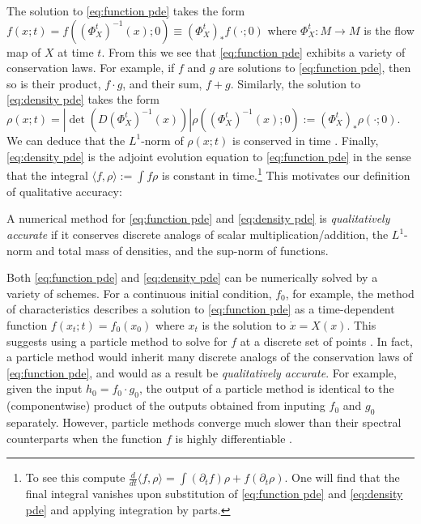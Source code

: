 \documentclass[final,leqno]{siamltex1213}
\begin{document}
The solution to \eqref{eq:function pde} takes the form $f(x;t) = f( (\Phi_{X}^{t})^{-1}(x) ; 0) \equiv (\Phi_{X}^{t})_{*} f(\cdot;0)$
where $\Phi_{X}^{t}:M \to M$ is the flow map of $X$ at time $t$.
From this we see that \eqref{eq:function pde} exhibits a variety of conservation laws.
For example, if $f$ and $g$ are solutions to \eqref{eq:function pde},
then so is their product, $f \cdot g$, and their sum, $f+g$.
Similarly, the solution to \eqref{eq:density pde} takes the form $\rho(x;t) = | \det( D(\Phi_{X}^{t})^{-1}(x) ) | \rho( (\Phi_{X}^{t})^{-1}(x) ;0) := (\Phi_{X}^{t})_{*} \rho(\cdot;0)$.
We can deduce that the $L^{1}$-norm of $\rho(x;t)$ is conserved in time \cite[Theorem 16.42]{Lee2006}.
Finally, \eqref{eq:density pde} is the adjoint evolution equation to \eqref{eq:function pde} in the sense that the integral $\langle f , \rho \rangle := \int f \rho$ is constant in time.\footnote{To see this compute
$\frac{d}{dt} \langle f , \rho \rangle = \int ( \partial_{t} f ) \rho + f ( \partial_{t} \rho) $.  One will find that the final integral vanishes upon substitution of \eqref{eq:function pde} and \eqref{eq:density pde} and applying integration by parts.}
This motivates our definition of qualitative accuracy:

\begin{definition} \label{def:quality}
	    A numerical method for \eqref{eq:function pde} and \eqref{eq:density pde} is \emph{qualitatively accurate} if it conserves discrete analogs of scalar multiplication/addition, the $L^{1}$-norm and total mass of densities, and the sup-norm of functions.
\end{definition}

Both \eqref{eq:function pde} and \eqref{eq:density pde} can be numerically solved by a variety of schemes.
For a continuous initial condition, $f_0$, for example, the method of characteristics \cite{Evans2010,MTA} describes a solution to \eqref{eq:function pde} as a time-dependent function $f( x_{t} ;t) = f_{0}( x_{0} )$ where $x_{t}$ is the solution to $\dot{x} = X(x)$.
This suggests using a particle method to solve for $f$ at a discrete set of points \cite{Leveque1992}.
 In fact, a particle method would inherit many discrete analogs of the conservation laws of \eqref{eq:function pde}, and would as a result be \emph{qualitatively accurate}.
For example, given the input $h_{0} = f_{0} \cdot g_{0}$, the output of a particle method is identical to the (componentwise) product of the outputs obtained from inputing $f_{0}$ and $g_{0}$ separately.
However, particle methods converge much slower than their spectral counterparts when the function $f$ is highly differentiable \cite{Boyd2001,Gottlieb2001}.
\end{document}
